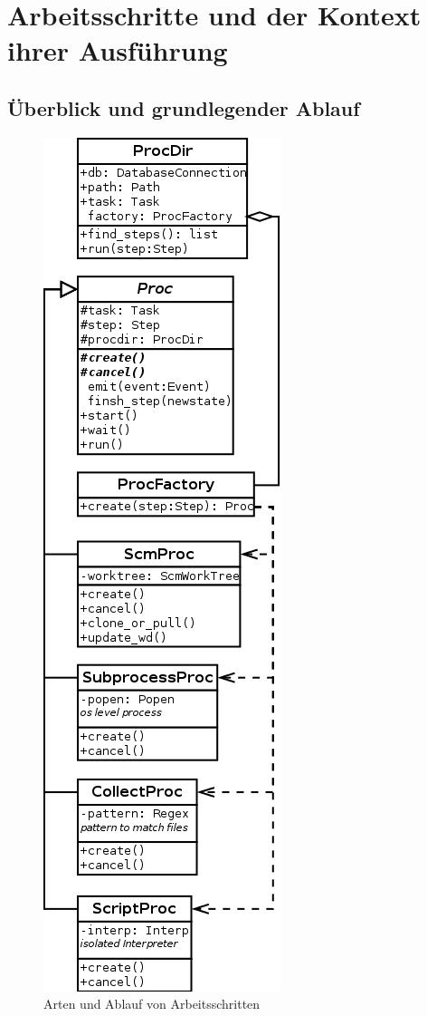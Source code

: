 \section{Arbeitsschritte und der Kontext ihrer Ausführung}
\label{sec:schritt-kontext}
\FloatBarrier

\subsection{Überblick und grundlegender Ablauf}

\begin{figure}[!ht]
    \centering
    \includegraphics[height=0.8\textheight]{imageinput/klassen-arten-arbeitsschritt.png}
    \caption{Arten und Ablauf von Arbeitsschritten}
    \label{fig:klassen-arten-arbeitsschritt}
\end{figure}

